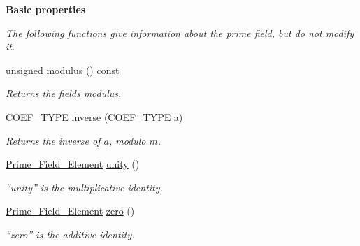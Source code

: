 \begin{Indent}\textbf{ Basic properties}\par
{\em The following functions give information about the prime field, but do not modify it. }\begin{DoxyCompactItemize}
\item 
\mbox{\label{group___fields_group_a342ee34fa19d33919f772669a637f31e}} 
unsigned \hyperlink{group___fields_group_a342ee34fa19d33919f772669a637f31e}{modulus} () const
\begin{DoxyCompactList}\small\item\em Returns the field\textquotesingle{}s modulus. \end{DoxyCompactList}\item 
C\+O\+E\+F\+\_\+\+T\+Y\+PE \hyperlink{group___fields_group_ab14cab08e6c2862e8470193112b69868}{inverse} (C\+O\+E\+F\+\_\+\+T\+Y\+PE a)
\begin{DoxyCompactList}\small\item\em Returns the inverse of $a$, modulo $m$. \end{DoxyCompactList}\item 
\mbox{\label{group___fields_group_ad9e3622a14de40faa75056ed40d67bb2}} 
\hyperlink{group___fields_group_class_prime___field___element}{Prime\+\_\+\+Field\+\_\+\+Element} \hyperlink{group___fields_group_ad9e3622a14de40faa75056ed40d67bb2}{unity} ()
\begin{DoxyCompactList}\small\item\em ``unity'' is the multiplicative identity. \end{DoxyCompactList}\item 
\mbox{\label{group___fields_group_a9dc12c3a50f6368a1c2f7cc1bddcb9eb}} 
\hyperlink{group___fields_group_class_prime___field___element}{Prime\+\_\+\+Field\+\_\+\+Element} \hyperlink{group___fields_group_a9dc12c3a50f6368a1c2f7cc1bddcb9eb}{zero} ()
\begin{DoxyCompactList}\small\item\em ``zero'' is the additive identity. \end{DoxyCompactList}\end{DoxyCompactItemize}
\end{Indent}
